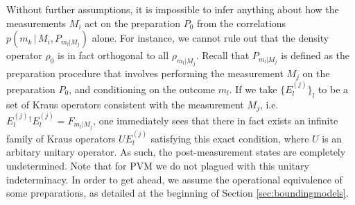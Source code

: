 Without further assumptions, it is impossible to infer anything about how the measurements $M_i$ act on the preparation $P_0$ from the correlations $p(m_k \, \vert \, M_i , P_{m_l\vert M_j} )$ alone. For instance, we cannot rule out that the density operator $\rho_0$ is in fact orthogonal to all $\rho_{m_l\vert M_j}$. Recall that $P_{m_l\vert M_j}$ is defined as the preparation procedure that involves performing the measurement $M_j$ on the preparation $P_0$, and conditioning on the outcome $m_l$. If we take $\{E_l^{(j)}\}_l$ to be a set of Kraus operators consistent with the measurement $M_j$, i.e. $E_l^{(j)}{}^{\dag}E_l^{(j)} = F_{m_l\vert M_j}$, one immediately sees that there in fact exists an infinite family of Kraus operators $UE_l^{(j)}$ satisfying this exact condition, where $U$ is an arbitary unitary operator. As such, the post-measurement states are completely undetermined.
Note that for PVM we do not plagued with this unitary indeterminacy. In order to get ahead, we assume the operational equivalence of some preparations, as detailed at the beginning of Section \ref{sec:boundingmodels}.


